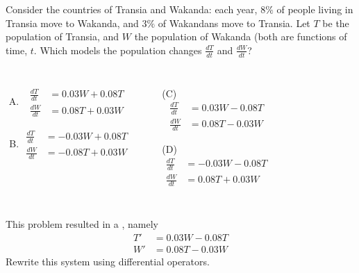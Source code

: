 \begin{applicationActivities}

\begin{activity}{10}
Consider the countries of Transia and Wakanda: each year, \(8\%\) of people living in Transia move to Wakanda, and \(3\%\) of Wakandans move to Transia.
\vfill
Let \(T\) be the population of Transia, and \(W\) the population of Wakanda (both are functions of time, \(t\).
\vfill
Which  models the population changes \(\frac{dT}{dt}\) and \(\frac{dW}{dt}\)?

\begin{columns}
\begin{enumerate}[(A)]
\item 
\begin{alignat*}{2}
\frac{dT}{dt} &= 0.03W+0.08T \\
\frac{dW}{dt} &= 0.08T+0.03W
\end{alignat*}
\item 
\begin{alignat*}{2}
\frac{dT}{dt} &= -0.03W+0.08T \\
\frac{dW}{dt} &= -0.08T+0.03W
\end{alignat*}
\end{enumerate}
\begin{enumerate}
\item[(C)]
\begin{alignat*}{2}
\frac{dT}{dt} &= 0.03W-0.08T \\
\frac{dW}{dt} &= 0.08T-0.03W
\end{alignat*}
\item[(D)]
\begin{alignat*}{2}
\frac{dT}{dt} &= -0.03W-0.08T \\
\frac{dW}{dt} &= 0.08T+0.03W
\end{alignat*}
\end{enumerate}
\end{columns}

\end{activity}

\begin{activity}{5}
This problem resulted in a , namely
\vfill
\begin{alignat*}{2}
T' &= 0.03W-0.08T \\
W' &= 0.08T-0.03W
\end{alignat*}
\vfill
Rewrite this system using differential operators.
\end{activity}


\end{applicationActivities}
